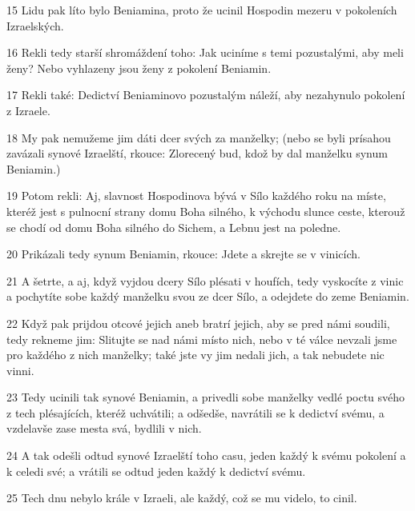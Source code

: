 \par 15 Lidu pak líto bylo Beniamina, proto že ucinil Hospodin mezeru v pokoleních Izraelských.
\par 16 Rekli tedy starší shromáždení toho: Jak uciníme s temi pozustalými, aby meli ženy? Nebo vyhlazeny jsou ženy z pokolení Beniamin.
\par 17 Rekli také: Dedictví Beniaminovo pozustalým náleží, aby nezahynulo pokolení z Izraele.
\par 18 My pak nemužeme jim dáti dcer svých za manželky; (nebo se byli prísahou zavázali synové Izraelští, rkouce: Zlorecený bud, kdož by dal manželku synum Beniamin.)
\par 19 Potom rekli: Aj, slavnost Hospodinova bývá v Sílo každého roku na míste, kteréž jest s pulnocní strany domu Boha silného, k východu slunce ceste, kterouž se chodí od domu Boha silného do Sichem, a Lebnu jest na poledne.
\par 20 Prikázali tedy synum Beniamin, rkouce: Jdete a skrejte se v vinicích.
\par 21 A šetrte, a aj, když vyjdou dcery Sílo plésati v houfích, tedy vyskocíte z vinic a pochytíte sobe každý manželku svou ze dcer Sílo, a odejdete do zeme Beniamin.
\par 22 Když pak prijdou otcové jejich aneb bratrí jejich, aby se pred námi soudili, tedy rekneme jim: Slitujte se nad námi místo nich, nebo v té válce nevzali jsme pro každého z nich manželky; také jste vy jim nedali jich, a tak nebudete nic vinni.
\par 23 Tedy ucinili tak synové Beniamin, a privedli sobe manželky vedlé poctu svého z tech plésajících, kteréž uchvátili; a odšedše, navrátili se k dedictví svému, a vzdelavše zase mesta svá, bydlili v nich.
\par 24 A tak odešli odtud synové Izraelští toho casu, jeden každý k svému pokolení a k celedi své; a vrátili se odtud jeden každý k dedictví svému.
\par 25 Tech dnu nebylo krále v Izraeli, ale každý, což se mu videlo, to cinil.

